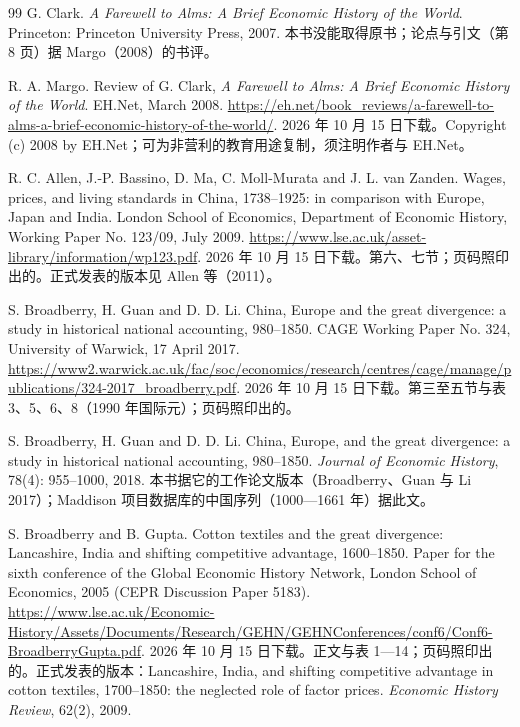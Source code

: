 \begin{thebibliography}{99}
 G. Clark. \emph{A Farewell to Alms: A Brief Economic History of the World}. Princeton: Princeton University Press, 2007. 本书没能取得原书；论点与引文（第 8 页）据 Margo（2008）的书评。

 R. A. Margo. Review of G. Clark, \emph{A Farewell to Alms: A Brief Economic History of the World}. EH.Net, March 2008. \url{https://eh.net/book_reviews/a-farewell-to-alms-a-brief-economic-history-of-the-world/}. 2026 年 10 月 15 日下载。Copyright (c) 2008 by EH.Net；可为非营利的教育用途复制，须注明作者与 EH.Net。

 R. C. Allen, J.-P. Bassino, D. Ma, C. Moll-Murata and J. L. van Zanden. Wages, prices, and living standards in China, 1738--1925: in comparison with Europe, Japan and India. London School of Economics, Department of Economic History, Working Paper No. 123/09, July 2009. \url{https://www.lse.ac.uk/asset-library/information/wp123.pdf}. 2026 年 10 月 15 日下载。第六、七节；页码照印出的。正式发表的版本见 Allen 等（2011）。

 S. Broadberry, H. Guan and D. D. Li. China, Europe and the great divergence: a study in historical national accounting, 980--1850. CAGE Working Paper No. 324, University of Warwick, 17 April 2017. \url{https://www2.warwick.ac.uk/fac/soc/economics/research/centres/cage/manage/publications/324-2017_broadberry.pdf}. 2026 年 10 月 15 日下载。第三至五节与表 3、5、6、8（1990 年国际元）；页码照印出的。

 S. Broadberry, H. Guan and D. D. Li. China, Europe, and the great divergence: a study in historical national accounting, 980--1850. \emph{Journal of Economic History}, 78(4): 955--1000, 2018. 本书据它的工作论文版本（Broadberry、Guan 与 Li 2017）；Maddison 项目数据库的中国序列（1000—1661 年）据此文。

 S. Broadberry and B. Gupta. Cotton textiles and the great divergence: Lancashire, India and shifting competitive advantage, 1600--1850. Paper for the sixth conference of the Global Economic History Network, London School of Economics, 2005 (CEPR Discussion Paper 5183). \url{https://www.lse.ac.uk/Economic-History/Assets/Documents/Research/GEHN/GEHNConferences/conf6/Conf6-BroadberryGupta.pdf}. 2026 年 10 月 15 日下载。正文与表 1—14；页码照印出的。正式发表的版本：Lancashire, India, and shifting competitive advantage in cotton textiles, 1700--1850: the neglected role of factor prices. \emph{Economic History Review}, 62(2), 2009.


\end{thebibliography}
